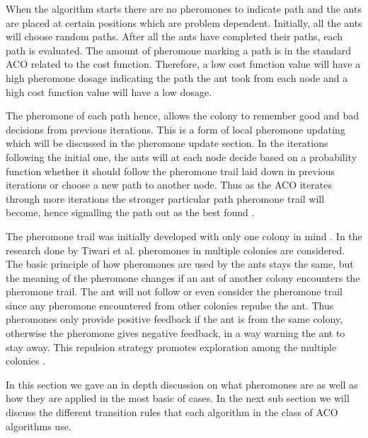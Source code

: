 When the algorithm starts there are no pheromones to indicate path and the ants are placed at certain positions which are problem dependent. Initially, all the ants will choose random paths. After all the ants have completed their paths, each path is evaluated\cite{CompuIntelligenceIntro}. The amount of pheromone marking a path is in the standard ACO related to the cost function. Therefore, a low cost function value will have a high pheromone dosage indicating the path the ant took from each node and a high cost function value will have a low dosage\cite{CompuIntelligenceIntro}. 

The pheromone of each path hence, allows the colony to remember good and bad decisions from previous iterations\cite{CompuIntelligenceIntro}. This is a form of local pheromone updating \label{def:localpheromoneupdate}which will be discussed in the pheromone update section. In the iterations following the initial one, the ants will at each node decide based on a probability function whether it should follow the pheromone trail laid down in previous iterations or choose a new path to another node. Thus as the ACO iterates through more iterations the stronger particular path pheromone trail will become, hence signalling the path out as the best found \cite{CompuIntelligenceIntro}.


The pheromone trail was initially developed with only one colony in mind \cite{CompuIntelligenceIntro}. In the research done by Tiwari et al. pheromones in multiple colonies are considered. The basic principle of how pheromones are used by the ants stays the same, but the meaning of the pheromone changes if an ant of another colony encounters the pheromone trail. The ant will not follow or even consider the pheromone trail since any pheromone encountered from other colonies repulse the ant. Thus pheromones only provide positive feedback if the ant is from the same colony, otherwise the pheromone gives negative feedback, in a way warning the ant to stay away. This repulsion strategy promotes exploration among the multiple colonies  \cite{ACOLargeProblem}.

In this section we gave an in depth discussion on what pheromones are as well as how they are applied in the most basic of cases. In the next sub section we will discuss the different transition rules that each algorithm in the class of ACO algorithms use.
